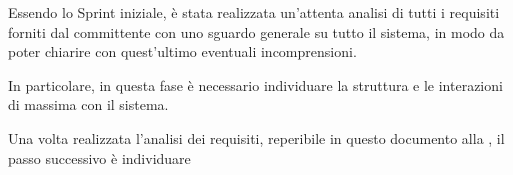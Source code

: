 

Essendo lo Sprint iniziale, è stata realizzata un'attenta analisi di tutti i requisiti forniti dal committente
con uno sguardo generale su tutto il sistema, in modo da poter chiarire con quest'ultimo eventuali incomprensioni.

In particolare, in questa fase è necessario individuare la struttura e le interazioni di massima con il sistema.

Una volta realizzata l'analisi dei requisiti, reperibile in questo documento alla ,
il passo successivo è individuare
